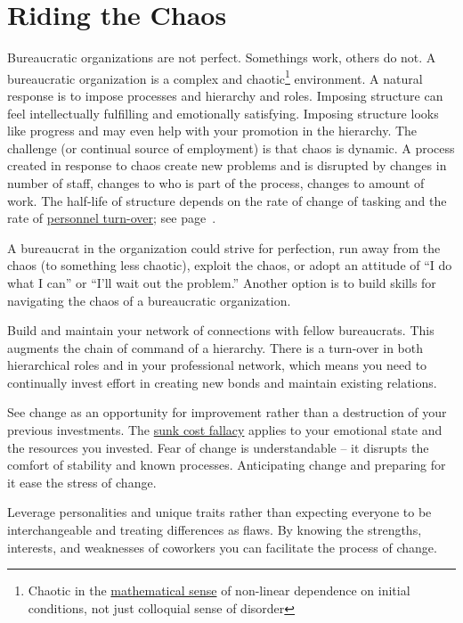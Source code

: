 \section{Riding the Chaos}

Bureaucratic organizations are not perfect. Somethings work, others do not. A bureaucratic organization is a complex and chaotic\footnote{Chaotic in the \href{https://en.wikipedia.org/wiki/Chaos_theory}{mathematical sense} of non-linear dependence on initial conditions, not just colloquial sense of disorder} environment. A natural response is to impose processes and hierarchy and roles. Imposing structure can feel intellectually fulfilling and emotionally satisfying. Imposing structure looks like progress and may even help with your promotion in the hierarchy. The challenge (or continual source of employment) is that chaos is dynamic. A process created in response to chaos create new problems and is disrupted by changes in number of staff, changes to who is part of the process, changes to amount of work. The half-life of structure depends on the rate of change of tasking and the rate of \hyperref[sec:turnover]{personnel turn-over}; see page~\pageref{sec:turnover}.

A bureaucrat in the organization could strive for perfection, run away from the chaos (to something less chaotic), exploit the chaos, or adopt an attitude of ``I do what I can'' or ``I'll wait out the problem.'' 
Another option is to build skills for navigating the chaos of a bureaucratic organization.

Build and maintain your network of connections with fellow bureaucrats. 
This augments the chain of command of a hierarchy. There is a turn-over in both hierarchical roles and in your professional network, which means you need to continually invest effort in creating new bonds and maintain existing relations. 

See change as an opportunity for improvement rather than a destruction of your previous investments. The \href{https://en.wikipedia.org/wiki/Sunk_cost}{sunk cost fallacy} applies to your emotional state and the resources you invested. Fear of change is understandable -- it disrupts the comfort of stability and known processes. Anticipating change and preparing for it ease the stress of change.

Leverage personalities and unique traits rather than expecting everyone to be interchangeable and treating differences as flaws. 
By knowing the strengths, interests, and weaknesses of coworkers you can facilitate the process of change. 